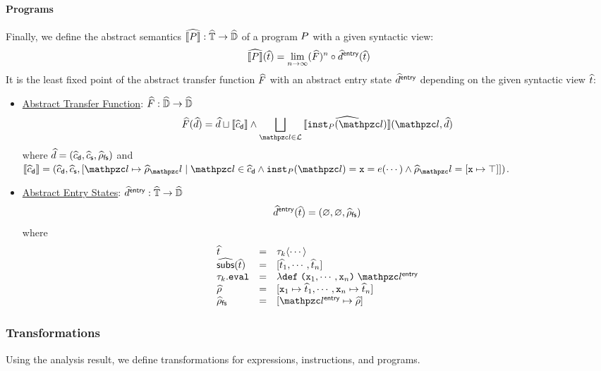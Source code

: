 \paragraph{Programs} Finally, we define the abstract semantics $\widehat{\llbracket{P}\rrbracket}:
\widehat{\mathbb{T}} \rightarrow \widehat{\mathbb{D}}$ of a program $P$ with a given syntactic
view:
\[
  \widehat{\llbracket{P}\rrbracket}(\widehat{t}) = \lim_{n \rightarrow \infty}(\widehat{F})^n \circ
  \widehat{d}^{\textsf{entry}}(\widehat{t})
\]
It is the least fixed point of the abstract transfer function $\widehat{F}$ with
an abstract entry state $\widehat{d}^{\textsf{entry}}$ depending on the given syntactic view
$\widehat{t}$:
\begin{itemize}
  \item \underline{Abstract Transfer Function}: $\widehat{F}: \widehat{\mathbb{D}}
    \rightarrow \widehat{\mathbb{D}}$
    \[
      \atransfer(\aelem) = \aelem \join \sem{\adcall} \wedge
      \bigjoin_{\lab \in \labset}{\asem{\getinst{\prog}(\lab)}(\lab, \aelem)}
    \]
    where $\widehat{d} = (\widehat{c}_{\textsf{d}}, \widehat{c}_{\textsf{s}}, \widehat{\rho}_{\textsf{fs}})$ and $\sem{\adcall} = (\adcall,
    \ascall, [\lab \mapsto \aenv_\lab \mid \lab \in \adcall \wedge
    \getinst{\prog}(\lab) = \varx = \expr(\cdots) \wedge \aenv_\lab = [\varx
    \mapsto \top]])$.
  \item \underline{Abstract Entry States}: $\widehat{d}^{\textsf{entry}}:
    \widehat{\mathbb{T}} \rightarrow \widehat{\mathbb{D}}$
    \[
      \widehat{d}^{\textsf{entry}}(\widehat{t}) = (\varnothing, \varnothing, \widehat{\rho}_{\textsf{fs}})
    \]
    where \[
      \begin{array}{lcl}
        \atree &=& \ty_k \langle \cdots \rangle\\

        \agetsubs(\atree) &=& [\atree_1, \cdots, \atree_n]\\

        \ty_k.\eval &=& \lambda \kwdef \; \kwrl \varx_1, \cdots, \varx_n \kwrr
        \; \entrylab\\

        \aenv &=& [\varx_1 \mapsto \atree_1, \cdots, \varx_n \mapsto
        \atree_n]\\

        \afsenv &=& [\entrylab \mapsto \aenv]\\
      \end{array}
    \]
\end{itemize}


\subsubsection{Transformations}

Using the analysis result, we define transformations for expressions,
instructions, and programs.

